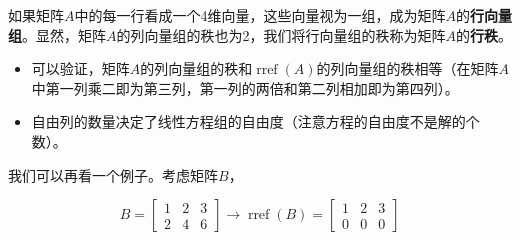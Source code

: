 如果矩阵$A$中的每一行看成一个4维向量，这些向量视为一组，成为矩阵$A$的\textcolor{third}{\bf 行向量组}。显然，矩阵$A$的列向量组的秩也为2，我们将行向量组的秩称为矩阵$A$的\textcolor{third}{\bf 行秩}。

\vspace{0.3cm}

\begin{note}
    \begin{itemize}
        \item 可以验证，矩阵$A$的列向量组的秩和$\operatorname{rref}(A)$的列向量组的秩相等（在矩阵$A$中第一列乘二即为第三列，第一列的两倍和第二列相加即为第四列）。


        \item 自由列的数量决定了线性方程组的自由度（注意方程的自由度不是解的个数）。
    \end{itemize}
\end{note}

\vspace{0.3cm}

我们可以再看一个例子。考虑矩阵$B$，

\begin{equation*}
B=\left[\begin{array}{rrr}
1 & 2 & 3 \\
2 & 4 & 6
\end{array}\right]
\longrightarrow
\operatorname{rref}(B)=\left[\begin{array}{rrr}
1 & 2 & 3 \\
0 & 0 & 0
\end{array}\right]
\label{eq:矩阵的秩例子2}
\end{equation*}

